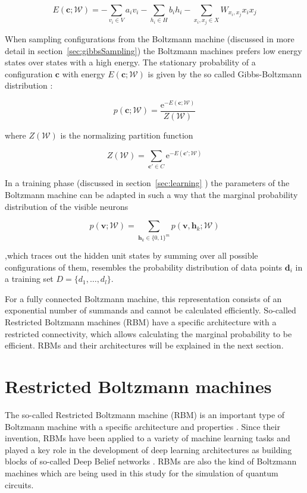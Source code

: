\begin{equation}
  E(\bm{c};\mathcal{W}) = - \sum_{v_i \in V} a_{i}v_{i} - \sum_{h_i \in H} b_{i}h_{i} - \sum_{x_i,x_j \in X} W_{x_i,x_j}x_{i}x_{j}
\end{equation}

When sampling configurations from the Boltzmann machine (discussed in more detail in section~\ref{sec:gibbsSampling}) the 
Boltzmann machines prefers low energy states over states with a high energy. The stationary probability
of a configuration $\bm{c}$ with energy $E(\bm{c};\mathcal{W})$ is given by the so called Gibbs-Boltzmann distribution \cite{gibbs_2010}:

\begin{equation}
   p(\bm{c};\mathcal{W}) = \frac{\mathrm{e}^{-E(\bm{c};\mathcal{W})}}{Z(\mathcal{W})}
\end{equation}

where $Z(\mathcal{W})$ is the normalizing partition function 

\begin{equation}
   Z(\mathcal{W}) = \sum_{\bm{c}\prime\in C} \mathrm{e}^{-E(\bm{c}\prime;\mathcal{W})}
\end{equation}

In a training phase (discussed in section~\ref{sec:learning} ) the parameters of the Boltzmann machine can be adapted in such a way that 
the marginal probability distribution of the visible neurons

\begin{equation}
    \label{eq:gbm}
   p(\bm{v};\mathcal{W}) = \sum_{\bm{h}_k \in \{0,1\}^m} p(\bm{v},\bm{h}_k;\mathcal{W})
\end{equation}

,which traces out the hidden unit 
states by summing over all possible configurations of them, resembles the probability 
distribution of data points $\bm{d}_i$ in a training set $D=\{d_1,\dots,d_l\}$.

For a fully connected Boltzmann machine, this representation consists of an exponential number of summands and cannot be calculated efficiently. So-called Restricted Boltzmann machines
(RBM) have a specific architecture with a restricted connectivity, which allows calculating the marginal probability to be efficient. RBMs and their architectures will be explained in the next section.

\section{Restricted Boltzmann machines}
The so-called Restricted Boltzmann machine (RBM) is an important type of Boltzmann machine with 
a specific architecture and properties \cite{smolensky1986information}. Since their invention, RBMs have been applied to a variety 
of machine learning tasks and played a 
key role in the development of deep learning architectures as building blocks of so-called 
Deep Belief networks \cite{bengio2009learning, hinton2006fast}.
RBMs are also the kind of Boltzmann machines which are being used in this study for the simulation 
of quantum circuits.

